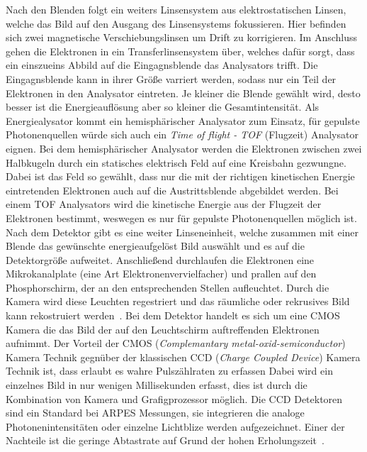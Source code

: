         Nach den Blenden folgt ein weiters Linsensystem aus elektrostatischen Linsen, welche das Bild auf den Ausgang des Linsensystems fokussieren.
        Hier befinden sich zwei magnetische Verschiebungslinsen um Drift zu korrigieren.
        Im Anschluss gehen die Elektronen in ein Transferlinsensystem über, welches dafür sorgt, dass ein einszueins Abbild auf die Eingagnsblende das Analysators trifft.
        Die Eingagnsblende kann in ihrer Größe varriert werden, sodass nur ein Teil der Elektronen in den Analysator eintreten.
        Je kleiner die Blende gewählt wird, desto besser ist die Energieauflösung aber so kleiner die Gesamtintensität.
        Als Energiealysator kommt ein hemisphärischer Analysator zum Einsatz, für gepulste Photonenquellen würde sich auch ein \textit{Time of flight - TOF} (Flugzeit) Analysator eignen.
        Bei dem hemisphärischer Analysator werden die Elektronen zwischen zwei Halbkugeln durch ein statisches elektrisch Feld auf eine Kreisbahn gezwungne.
        Dabei ist das Feld so gewählt, dass nur die mit der richtigen kinetischen Energie eintretenden Elektronen auch auf die Austrittsblende abgebildet werden.
        Bei einem TOF Analysators wird die kinetische Energie aus der Flugzeit der Elektronen bestimmt, weswegen es nur für gepulste Photonenquellen möglich ist.
        Nach dem Detektor gibt es eine weiter Linseneinheit, welche zusammen mit einer Blende das gewünschte energieaufgelöst Bild auswählt und es auf die Detektorgröße aufweitet.
        Anschließend durchlaufen die Elektronen eine Mikrokanalplate (eine Art Elektronenvervielfacher) und prallen auf den Phosphorschirm, der an den entsprechenden Stellen aufleuchtet.
        Durch die Kamera wird diese Leuchten regestriert und das räumliche oder rekrusives Bild kann rekostruiert werden~\cite{SPECS-MM}.
        Bei dem Detektor handelt es sich um eine CMOS Kamera die das Bild der auf den Leuchtschirm auftreffenden Elektronen aufnimmt.
        Der Vorteil der CMOS (\textit{Complemantary metal-oxid-semiconductor}) Kamera Technik gegnüber der klassischen CCD (\textit{Charge Coupled Device}) Kamera Technik ist, dass erlaubt es wahre Pulszählraten zu erfassen 
        Dabei wird ein einzelnes Bild in nur wenigen Millisekunden erfasst, dies ist durch die Kombination von Kamera und Grafigprozessor möglich.
        Die CCD Detektoren sind ein Standard bei ARPES Messungen, sie integrieren die analoge Photonenintensitäten oder einzelne Lichtblize werden aufgezeichnet.
        Einer der Nachteile ist die geringe Abtastrate auf Grund der hohen Erholungszeit~\cite{CMOS}.

